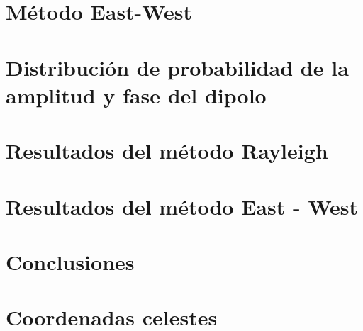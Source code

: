 \documentclass[12pt,papel,twoside,pagebackref]{ibtesis}
\begin{document}
\chapter{Método East-West}
	\graphicspath{{../EW/}}
	
	
\chapter{Distribución de probabilidad de la amplitud y fase del dipolo} \label{PDFs}
	\graphicspath{{../EW/}}
	

\chapter{Resultados del método Rayleigh}
	\graphicspath{{../Dipole_1-2_EeVReport/}}
	


\chapter{Resultados del método East - West}
	\graphicspath{{../EW/}}	
	

\chapter{Conclusiones}
\graphicspath{{../Conclusiones/}}	
	

\appendix
	\chapter{Coordenadas celestes}
	\graphicspath{{../Apendice/}}	
	

\begin{biblio}
	
\end{biblio}
\end{document}
